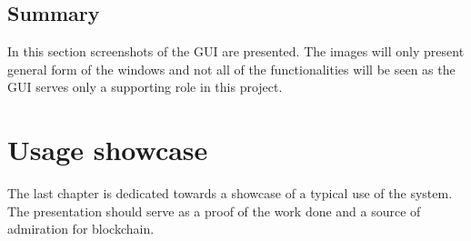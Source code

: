 \documentclass[a4paper,12pt,twoside,openany]{report}
\begin{document}
\section{Summary}

In this section screenshots of the GUI are presented. The images will only present general form of the windows and not all of the functionalities will be seen as the GUI serves only a supporting role in this project.


\chapter{Usage showcase}

The last chapter is dedicated towards a showcase of a typical use of the system. The presentation should serve as a proof of the work done and a source of admiration for blockchain. 
\end{document}
